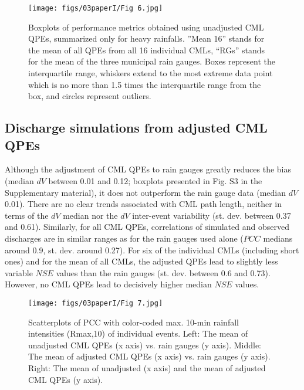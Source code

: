 \documentclass{ctuthesis}\usepackage[]{graphicx}\usepackage[]{color}
\begin{document}
\begin{figure}[h]
\begin{center}
\texttt{[image: figs/03paperI/Fig 6.jpg]}
\caption{Boxplots of performance metrics obtained using unadjusted CML QPEs, summarized only for heavy rainfalls. ”Mean 16” stands for the mean of all QPEs from all 16 individual CMLs, “RGs” stands for the mean of the three municipal rain gauges. Boxes represent the interquartile range, whiskers extend to the most extreme data point which is no more than 1.5 times the interquartile range from the box, and circles represent outliers.} \label{3fig6}
\end{center}
\end{figure}


\subsection{Discharge simulations from adjusted CML QPEs}

Although the adjustment of CML QPEs to rain gauges greatly reduces the bias (median $dV$ between 0.01 and 0.12; boxplots presented in Fig. S3 in the Supplementary material), it does not outperform the rain gauge data (median $dV$ 0.01). There are no clear trends associated with CML path length, neither in terms of the $dV$ median nor the $dV$ inter-event variability (st. dev. between 0.37 and 0.61). Similarly, for all CML QPEs, correlations of simulated and observed discharges are in similar ranges as for the rain gauges used alone ($PCC$ medians around 0.9, st. dev. around 0.27). For six of the individual CMLs (including short ones) and for the mean of all CMLs, the adjusted QPEs lead to slightly less variable $NSE$ values than the rain gauges (st. dev. between 0.6 and 0.73). However, no CML QPEs lead to decisively higher median $NSE$ values.


\begin{figure}[h]
\begin{center}
\texttt{[image: figs/03paperI/Fig 7.jpg]}
\caption{Scatterplots of PCC with color-coded max. 10-min rainfall intensities (Rmax,10) of individual events. Left: The mean of unadjusted CML QPEs (x axis) vs. rain gauges (y axis). Middle: The mean of adjusted CML QPEs (x axis) vs. rain gauges (y axis). Right: The mean of unadjusted (x axis) and the mean of adjusted CML QPEs (y axis).} \label{3fig7}
\end{center}
\end{figure}
\end{document}

